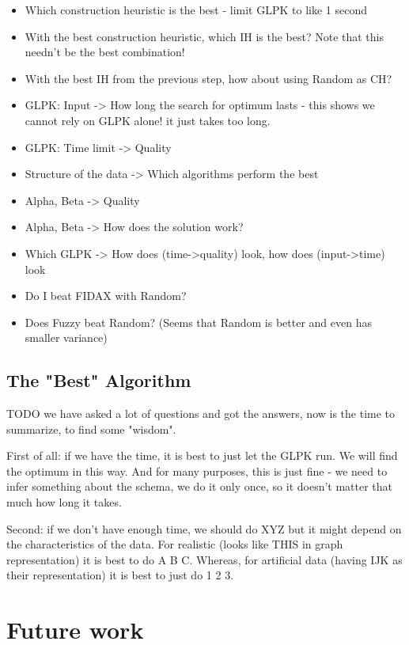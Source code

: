 \documentclass[a4paper,12pt,oneside]{report}
\begin{document}
\begin{itemize}
  \item Which construction heuristic is the best - limit GLPK to like 1 second
  \item With the best construction heuristic, which IH is the best? Note that this needn't be the best combination!
  \item With the best IH from the previous step, how about using Random as CH?
	\item GLPK: Input -> How long the search for optimum lasts - this shows we cannot rely on GLPK alone! it just takes too long.
	\item GLPK: Time limit -> Quality
	\item Structure of the data -> Which algorithms perform the best
	\item Alpha, Beta -> Quality
  \item Alpha, Beta -> How does the solution work?
	\item Which GLPK -> How does (time->quality) look, how does (input->time) look
	\item Do I beat FIDAX with Random?
	\item Does Fuzzy beat Random? (Seems that Random is better and even has smaller variance)
\end{itemize}

\section{The "Best" Algorithm}

TODO we have asked a lot of questions and got the answers, now is the time to summarize, to find some "wisdom".

First of all: if we have the time, it is best to just let the GLPK run. 
We will find the optimum in this way. 
And for many purposes, this is just fine - we need to infer something about the schema, we do it only once, so it doesn't matter that much how long it takes.

Second: if we don't have enough time, we should do XYZ but it might depend on the characteristics of the data.
For realistic (looks like THIS in graph representation) it is best to do A B C.
Whereas, for artificial data (having IJK as their representation) it is best to just do 1 2 3.

\chapter{Future work}
\end{document}
